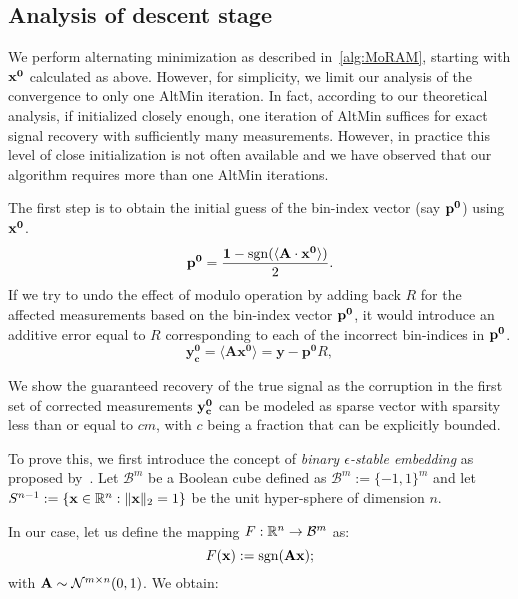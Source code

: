 \subsection{Analysis of descent stage}
We perform alternating minimization as described in~\ref{alg:MoRAM}, starting with $\mathbf{x^0}$ calculated as above. However, for simplicity, we limit our analysis of the convergence to only one AltMin iteration. In fact, according to our theoretical analysis, if initialized closely enough, one iteration of AltMin suffices for exact signal recovery with sufficiently many measurements. However, in practice this level of close initialization is not often available and we have observed that our algorithm requires more than one AltMin iterations. %

The first step is to obtain the initial guess of the bin-index vector (say $\mathbf{p^0}$) using $\mathbf{x^0}$.
$$
\mathbf{{p}^{0}} = \frac{\mathbf{1}-\mathrm{sgn}(\langle \mathbf{A} \cdot \mathbf{x^0} \rangle)}{2}.
$$
If we try to undo the effect of modulo operation by adding back $R$ for the affected measurements based on the bin-index vector $\mathbf{p^0}$, it would introduce an additive error equal to $R$ corresponding to each of the incorrect bin-indices in $\mathbf{p^0}$.
$$
\mathbf{y^0_c} = \langle \mathbf{A}\mathbf{x^{0}} \rangle = \mathbf{y} - \mathbf{p^0}R,
$$

We show the guaranteed recovery of the true signal as the corruption in the first set of corrected measurements $\mathbf{y_c^0}$ can be modeled as sparse vector with sparsity less than or equal to $cm$, with $c$ being a fraction that can be explicitly bounded.

To prove this, we first introduce the concept of \emph{binary $\epsilon$-stable embedding} as proposed by~\cite{Jacques2013}. Let $\mathcal{B}^m$ be a Boolean cube defined as $\mathcal{B}^m := \{-1,1\}^m$ and let $S^{n-1}:=\{\mathbf{x}\in {\mathbb{R}}^n : \|\mathbf{x}\|_2 = 1\}$ be the unit hyper-sphere of dimension $n$.


In our case, let us define the mapping $F: {\mathbb{R}}^n \rightarrow \mathcal{B}^m$ as:
$$
F(\mathbf{x}):= \mathrm{sgn}(\mathbf{Ax});
$$
with $\mathbf{A} \sim \mathcal{N}^{m \times n}(0,1)$. We obtain:


